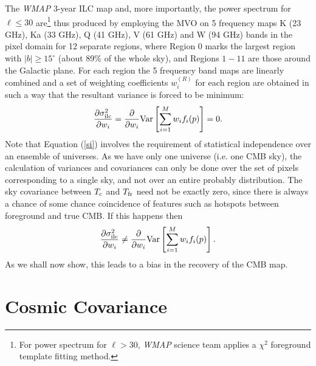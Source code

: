 \documentclass{emulateapj}
\def\cmb{{\rm c}}
\def\ilc{{\rm ilc}}
\def\wmap{{\sl WMAP }}
\def\l{{\ell}}
\def\f{{\rm fr}}
\begin{document}
The \wmap 3-year ILC map and, more importantly, the power spectrum for $\l\le30$ are\footnote{For power spectrum for $\l > 30$, \wmap science team applies a $\chi^2$ foreground template fitting method.} thus produced by employing the MVO on 5 frequency maps K (23 GHz), Ka (33 GHz), Q (41 GHz), V (61 GHz) and W (94 GHz) bands in
the pixel domain for 12 separate regions, where Region 0 marks the
largest region with $|b| \geq 15^\circ$ (about 89\% of the whole
sky), and Regions $1-11$ are those around the Galactic plane. For
each region the 5 frequency band maps are linearly combined and a
set of weighting coefficients $w_i^{(R)}$ for each region are
obtained in such a way that the resultant variance is forced to be
minimum:
\begin{equation}
\frac{\partial \sigma_\ilc^2}{\partial w_i} =
\frac{\partial}{\partial w_i} {\rm Var} \left[ \sum_{i=1}^M w_i
f_i(p) \right]=0.
\end{equation}
Note that Equation (\ref{si}) involves the requirement of
statistical independence over an ensemble of universes. As we have
only one universe (i.e. one CMB sky), the calculation of variances
and covariances can only be done over the set of pixels
corresponding to a single sky, and not over an entire probably
distribution. The sky covariance between $T_\cmb$ and $T_\f$ need not
be exactly zero, since there is always a chance of some chance
coincidence of features such as hotspots between foreground and true
CMB. If this happens then
\begin{equation}
\frac{\partial \sigma_\ilc^2}{\partial w_i} \ne
\frac{\partial}{\partial w_i} {\rm Var} \left[ \sum_{i=1}^M w_i
f_i(p) \right].
\end{equation}
As we shall now show, this leads to a bias in the recovery of the
CMB map.

\section{Cosmic Covariance}
\end{document}
